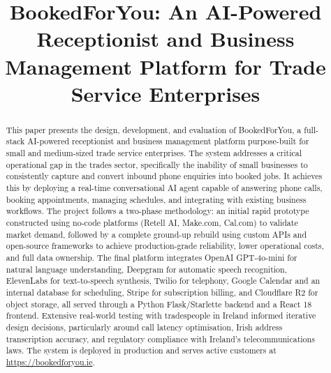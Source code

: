 \documentclass[conference]{IEEEtran}
\begin{document}
\title{BookedForYou: An AI-Powered Receptionist and Business Management Platform for Trade Service Enterprises}

\author{
\and
{}
}

\maketitle

\begin{abstract}
This paper presents the design, development, and evaluation of BookedForYou, a full-stack AI-powered receptionist and business management platform purpose-built for small and medium-sized trade service enterprises. The system addresses a critical operational gap in the trades sector, specifically the inability of small businesses to consistently capture and convert inbound phone enquiries into booked jobs. It achieves this by deploying a real-time conversational AI agent capable of answering phone calls, booking appointments, managing schedules, and integrating with existing business workflows. The project follows a two-phase methodology: an initial rapid prototype constructed using no-code platforms (Retell AI, Make.com, Cal.com) to validate market demand, followed by a complete ground-up rebuild using custom APIs and open-source frameworks to achieve production-grade reliability, lower operational costs, and full data ownership. The final platform integrates OpenAI GPT-4o-mini for natural language understanding, Deepgram for automatic speech recognition, ElevenLabs for text-to-speech synthesis, Twilio for telephony, Google Calendar and an internal database for scheduling, Stripe for subscription billing, and Cloudflare R2 for object storage, all served through a Python Flask/Starlette backend and a React 18 frontend. Extensive real-world testing with tradespeople in Ireland informed iterative design decisions, particularly around call latency optimisation, Irish address transcription accuracy, and regulatory compliance with Ireland's telecommunications laws. The system is deployed in production and serves active customers at \url{https://bookedforyou.ie}.
\end{abstract}
\end{document}
